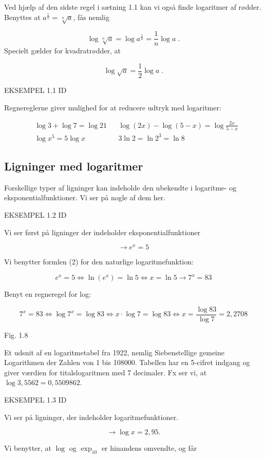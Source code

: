 \documentclass[12pt,oneside,a4paper]{article}
\theoremstyle{plain}
\begin{document}
Ved hjælp af den sidste regel i sætning 1.1 kan vi også finde logaritmer af
rødder. Benyttes at $a^{\frac{1}{n}} = \sqrt[n]{a}$, fås nemlig

\[
\log \sqrt[n]{a} = \log a^{\frac{1}{n}} = \frac{1}{n} \log a \; .
\]
Specielt gælder for kvadratrødder, at

\[
\log \sqrt{a} = \frac{1}{2} \log a \; .
\]

EKSEMPEL 1.1 ID

Regnereglerne giver mulighed for at reducere udtryk med logaritmer:

\[
\begin{aligned}
    &\log 3 + \log 7 = \log 21 && \log (2x) - \log (5 - x) = \log \frac{2x}{5 - x} \\
    &\log x^5 = 5 \log x && 3 \ln 2 = \ln 2^3 = \ln 8
\end{aligned}
\]

\subsection*{Ligninger med logaritmer}
Forskellige typer af ligninger kan indeholde den ubekendte i logaritme- og
eksponentialfunktioner. Vi ser på nogle af dem her.

EKSEMPEL 1.2 ID

Vi ser først på ligninger der indeholder eksponentialfunktioner

\[
\rightarrow e^x = 5
\]

Vi benytter formlen (2) for den naturlige logaritmefunktion:

\[
e^x = 5 \iff \ln (e^x) = \ln 5 \iff x = \ln 5
\rightarrow 7^x = 83
\]

Benyt en regneregel for log:

\[
7^x = 83 \iff \log 7^x = \log 83 \iff
x \cdot \log 7 = \log 83 \iff x = \frac{\log 83}{\log 7} = 2,2708
\]

Fig. 1.8

Et udsnit af en logaritmetabel fra 1922, nemlig Siebenstellige gemeine
Logarithmen der Zahlen von 1 bis 108000. Tabellen har en 5-cifret indgang og
giver værdien for titalslogaritmen med 7 decimaler. Fx ser vi, at $\log 3,5562 =
0,5509862$.

EKSEMPEL 1.3 ID

Vi ser på ligninger, der indeholder logaritmefunktioner. 

\[
\rightarrow \log x = 2,95.
\]

Vi benytter, at $\log$ og $\exp_{10}$ er hinandens omvendte, og får
\end{document}
